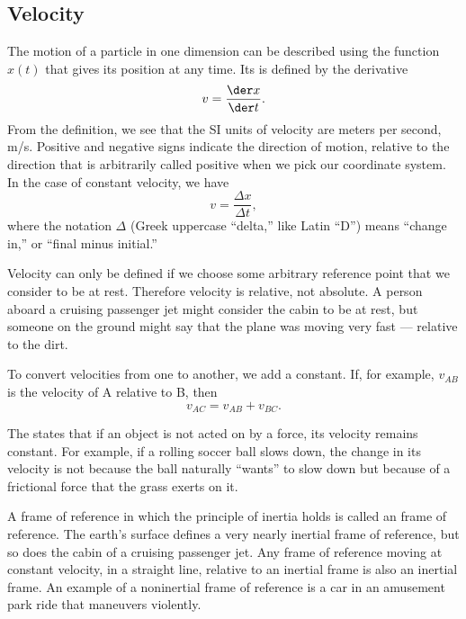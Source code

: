 \subsection{Velocity}
The motion of a particle in one dimension can be described using the
function $x(t)$ that gives its position at any time. Its  is
defined by the derivative
\begin{equation}
  v = \frac{\der x}{\der t}.
\end{equation}
From the definition, we see that the SI units of velocity are meters per second, m/s.
Positive and negative signs indicate the direction of motion, relative
to the direction that is arbitrarily called positive when we pick our
coordinate system. In the case of constant velocity, we have
\begin{equation}
  v = \frac{\Delta x}{\Delta t},
\end{equation}
where the notation $\Delta$ (Greek uppercase ``delta,'' like Latin ``D'') means ``change in,''
or ``final minus initial.''

Velocity can only be defined if we choose some arbitrary reference point that we consider
to be at rest. Therefore velocity is relative, not absolute. A person aboard a cruising
passenger jet might consider the cabin to be at rest, but someone on the ground might
say that the plane was moving very fast --- relative to the dirt.

To convert velocities
from one  to another, we add a constant. If, for example, $v_{AB}$ is the velocity
of A relative to B, then
\begin{equation}
  v_{AC} = v_{AB}+v_{BC}.
\end{equation}

The 
states that if an object is not acted on by a force, its
velocity remains constant. For example, if a rolling soccer ball slows down, the change in
its velocity is not because the ball naturally ``wants'' to slow down but because of a frictional
force that the grass exerts on it.

A frame of reference in which the principle of inertia holds
is called an  frame of reference.
The earth's surface defines a very nearly inertial
frame of reference, but so does the cabin of a cruising passenger jet. Any frame of reference
moving at constant velocity, in a straight line, relative to an inertial frame is also an
inertial frame. An example of a noninertial frame of reference is a car in an amusement
park ride that maneuvers violently.

